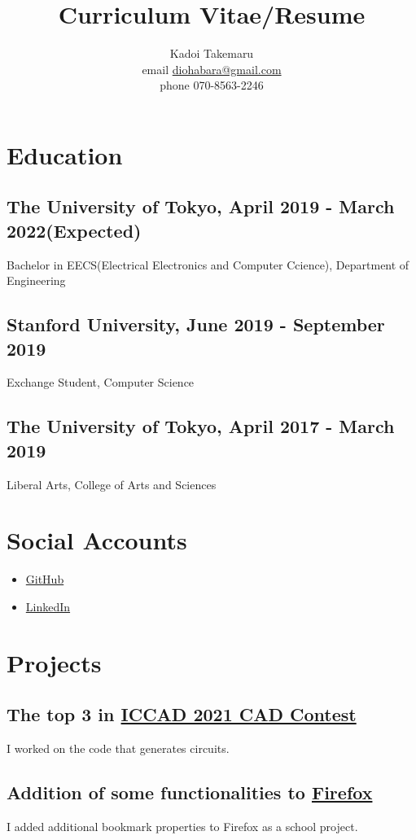\documentclass{article}
\title{Curriculum Vitae/Resume}
\author{Kadoi Takemaru \\ email \href{mailto:diohabara@gmail.com}{diohabara@gmail.com} \\ phone 070-8563-2246}
\begin{document}
\maketitle

\section*{Education}
  \subsection*{The University of Tokyo, April 2019 - March 2022(Expected)}
    Bachelor in EECS(Electrical Electronics and Computer Ccience), Department of Engineering
  \subsection*{Stanford University, June 2019 - September 2019}
    Exchange Student, Computer Science
  \subsection*{The University of Tokyo, April 2017 - March 2019}
    Liberal Arts, College of Arts and Sciences

\section*{Social Accounts}
  \begin{itemize}
    \item \href{https://github.com/diohabara/}{GitHub}
    \item \href{https://www.linkedin.com/in/takemaru-kadoi-6950b5172/}{LinkedIn}
  \end{itemize}

\section*{Projects}
  \subsection*{The top 3 in \href{http://iccad-contest.org/2021/}{ICCAD 2021 CAD Contest}}
    I worked on the code that generates circuits.

  \subsection*{Addition of some functionalities to \href{https://slides.com/diohabara/deck}{Firefox}}
    I added additional bookmark properties to Firefox as a school project.
  
\end{document}
